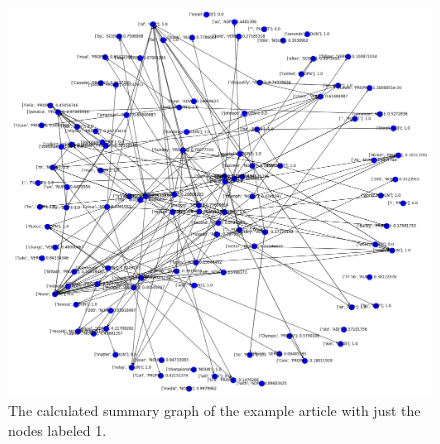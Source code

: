 \begin{figure}[!ht]
	\centering
	\includegraphics[width=150mm, keepaspectratio]{figures/usain_bolt_predicted.png}
	\caption{The calculated summary graph of the example article with just the nodes labeled 1.}
	\label{fig:usain_bolt_predicted0}
\end{figure}

\FloatBarrier

